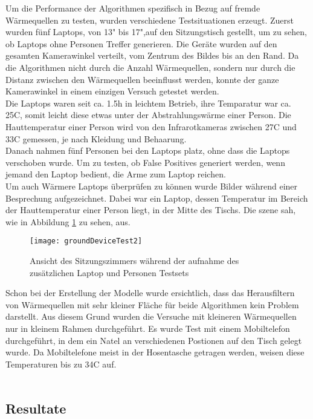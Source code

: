 Um die Performance der Algorithmen spezifisch in Bezug auf fremde Wärmequellen zu testen, wurden verschiedene Testsituationen erzeugt. Zuerst wurden fünf Laptops, von 13" bis 17",auf den Sitzungstisch gestellt, um zu sehen, ob Laptops ohne Personen Treffer generieren. Die Geräte wurden auf den gesamten Kamerawinkel verteilt, vom Zentrum des Bildes bis an den Rand. Da die Algorithmen nicht durch die Anzahl Wärmequellen, sondern nur durch die Distanz zwischen den Wärmequellen beeinflusst werden, konnte der ganze Kamerawinkel in einem einzigen Versuch getestet werden.\\
Die Laptops waren seit ca. 1.5h in leichtem Betrieb, ihre Temparatur war ca. 25\degree C, somit leicht diese etwas unter der Abstrahlungswärme einer Person. Die Hauttemperatur einer Person wird von den Infrarotkameras zwischen 27\degree C und 33\degree C gemessen, je nach Kleidung und Behaarung.\\
Danach nahmen fünf Personen bei den Laptops platz,  ohne dass die Laptops verschoben wurde. Um zu testen, ob False Positives generiert werden, wenn jemand den Laptop bedient, die Arme zum Laptop reichen.\\
Um auch Wärmere Laptops überprüfen zu können wurde Bilder während einer Besprechung aufgezeichnet. Dabei war ein Laptop, dessen Temperatur im Bereich der Hauttemperatur einer Person liegt, in der Mitte des Tischs. Die szene sah, wie in Abbildung \ref{fig:groundDeviceTest2} zu sehen, aus.
\\
\begin{figure}[H]
	\centering
	\texttt{[image: groundDeviceTest2]}
	\caption{Ansicht des Sitzungszimmers während der aufnahme des zusätzlichen Laptop und Personen Testsets}
	\label{fig:groundDeviceTest2}
\end{figure}
Schon bei der Erstellung der Modelle wurde ersichtlich, dass das Herausfiltern von Wärmequellen mit sehr kleiner Fläche für beide Algorithmen kein Problem darstellt. Aus diesem Grund wurden die Versuche mit kleineren Wärmequellen nur in kleinem Rahmen durchgeführt. Es wurde Test mit einem Mobiltelefon durchgeführt, in dem ein Natel an verschiedenen Postionen auf den Tisch gelegt wurde. Da Mobiltelefone meist in der Hosentasche getragen werden, weisen diese Temperaturen bis zu 34\degree C auf.\\
\\

\subsection{Resultate}

